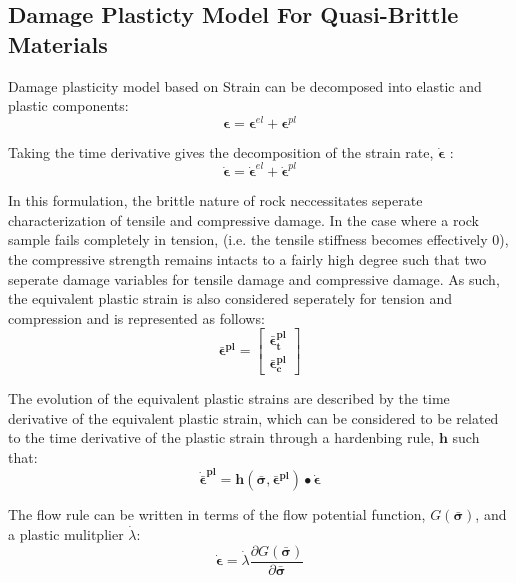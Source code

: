 \subsection{Damage Plasticty Model For Quasi-Brittle Materials}

Damage plasticity model based on 
Strain can be decomposed into elastic and plastic components:
\begin{equation}
\label{eqn:const1}
\boldsymbol{\epsilon} = \boldsymbol{\epsilon}^{el} + \boldsymbol{\epsilon}^{pl}
\end{equation}

Taking the time derivative gives the decomposition of the strain rate, $\boldsymbol{\dot{\epsilon}}$ :
\begin{equation}
\label{eqn:const2}
\boldsymbol{\dot{\epsilon}} = \boldsymbol{\dot{\epsilon}}^{el} + \boldsymbol{\dot{\epsilon}}^{pl}
\end{equation}

In this formulation, the brittle nature of rock neccessitates seperate characterization of tensile and compressive damage. In the case where a rock sample fails completely in tension, (i.e. the tensile stiffness becomes effectively 0), the compressive strength remains intacts to a fairly high degree such that two seperate damage variables for tensile damage and compressive damage. As such, the equivalent plastic strain is also considered seperately for tension and compression and is represented as follows:
\begin{equation}
\label{eqn:const9}
\boldsymbol{\bar{\epsilon}^{pl}} = \begin{bmatrix} 
	\boldsymbol{\bar{\epsilon}_t^{pl}} \\ 
	\boldsymbol{\bar{\epsilon}_c^{pl}} \end{bmatrix}
\end{equation}

The evolution of the equivalent plastic strains are described by the time derivative of the equivalent plastic strain, which can be considered to be related to the time derivative of the plastic strain through a hardenbing rule, $\mathbf{h}$ such that:
\begin{equation}
\label{eqn:const10}
\boldsymbol{\dot{\bar{\epsilon}}^{pl}} = \mathbf{h}(\boldsymbol{\bar{\sigma}},
	\boldsymbol{\bar{\epsilon}^{pl}})\bullet \boldsymbol{\dot{\epsilon}} 
\end{equation}

The flow rule can be written in terms of the flow potential function, $G(\boldsymbol{\bar{\sigma}})$, and a plastic mulitplier $\dot{\lambda}$:
\begin{equation}
\label{eqn:const11}
\boldsymbol{\dot{\epsilon}} = \dot{\lambda} \dfrac{\partial G(\boldsymbol{\bar{\sigma}})}{\partial \boldsymbol{\bar{\sigma}}}
\end{equation}

